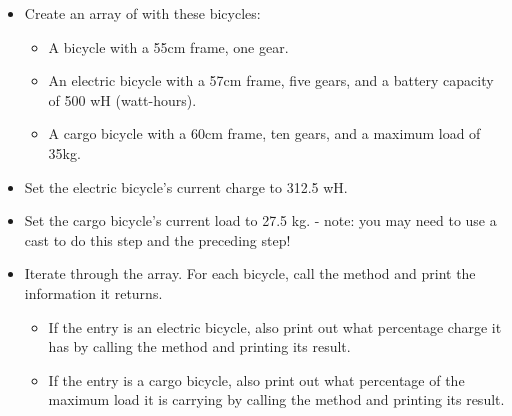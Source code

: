 \begin{exercise}
\begin{itemize}
\item Create an array of  with these bicycles:
    \begin{itemize}
    \item A bicycle with a 55cm frame, one gear.
    \item An electric bicycle with a 57cm frame, five gears, and a battery capacity of 500 wH (watt-hours).
    \item A cargo bicycle with a 60cm frame, ten gears, and a maximum load of 35kg.
    \end{itemize}
\item Set the electric bicycle's current charge to 312.5 wH.
\item Set the cargo bicycle's current load to 27.5 kg. - note: you may need to use a cast to do this step and the preceding step!
\item Iterate through the array. For each bicycle, call the  method and print the information it returns.
    \begin{itemize}
    \item If the entry is an electric bicycle, also print out what percentage charge it has by calling the  method and printing its result.
    \item If the entry is a cargo bicycle, also print out what percentage of the maximum load it is carrying by calling the  method and printing its result.
    \end{itemize}
\end{itemize}

\end{exercise}

